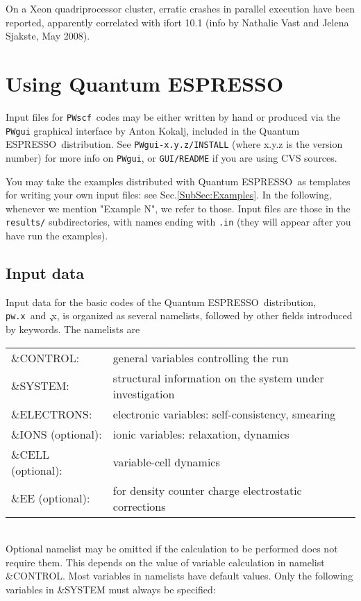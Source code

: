 \documentclass[12pt,a4paper]{article}
\def\qe{{\sc Quantum ESPRESSO}}
\def\pw.x{\texttt{pw.x}}
\def\PWscf{\texttt{PWscf}}
\begin{document}
On a Xeon quadriprocessor cluster, erratic crashes in parallel
execution have been reported, apparently correlated with ifort 10.1
(info by Nathalie Vast and Jelena Sjakste, May 2008).
\newpage

\section{Using \qe}

Input files for \PWscf\ codes may be either written by hand 
or produced via the \texttt{PWgui} graphical interface by Anton Kokalj, 
included in the \qe\ distribution. See \texttt{PWgui-x.y.z/INSTALL}
(where x.y.z is the version number) for more info on \texttt{PWgui}, 
or \texttt{GUI/README} if you are using CVS sources.
    
You may take the examples distributed with \qe\ as
templates for writing your own input files: see Sec.\ref{SubSec:Examples}.
In the following, whenever we mention "Example N", we refer to those. 
Input files are those in the \texttt{results/} subdirectories, with names ending
with \texttt{.in} 
(they will appear after you have run the examples).
    

\subsection{Input data}

Input data for the basic codes of the \qe\ distribution, \pw.x\ and \c.x,
is organized as several namelists, followed by other fields
introduced by keywords. The namelists are

\begin{tabular}{ll}
      \&CONTROL:& general variables controlling the run\\
      \&SYSTEM: &structural information on the system under investigation\\
      \&ELECTRONS: &electronic variables: self-consistency, smearing\\
      \&IONS (optional): &ionic variables: relaxation, dynamics\\
      \&CELL (optional): &variable-cell dynamics\\
      \&EE  (optional): &for density counter charge electrostatic corrections
\end{tabular}    \\
Optional namelist may be omitted if the calculation to be performed
does not require them. This depends on the value of variable calculation
in namelist \&CONTROL. Most variables in namelists have default values. Only
the following variables in \&SYSTEM must always be specified:
\end{document}
